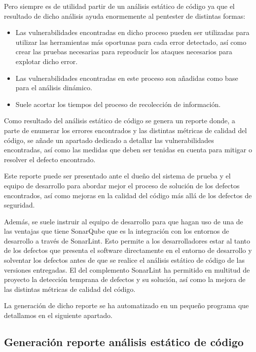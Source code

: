 Pero siempre es de utilidad partir de un análisis estático de código ya que el resultado de dicho 
análisis ayuda enormemente al pentester de distintas formas:

\begin{itemize}
    \item Las vulnerabilidades encontradas en dicho proceso pueden ser utilizadas para utilizar las herramientas más 
    oportunas para cada error detectado, así como crear las pruebas necesarias para reproducir los ataques necesarios 
    para explotar dicho error.
    \item Las vulnerabilidades encontradas en este proceso son añadidas como base para el análisis dinámico.
    \item Suele acortar los tiempos del proceso de recolección de información.
\end{itemize}

Como resultado del análisis estático de código se genera un reporte donde, a parte de enumerar los errores
encontrados y las distintas métricas de calidad del código, se añade un apartado dedicado a detallar las 
vulnerabilidades encontradas, así como las medidas que deben ser tenidas en cuenta para mitigar o resolver el defecto encontrado.

Este reporte puede ser presentado ante el dueño del sistema de prueba y el equipo de desarrollo para abordar mejor 
el proceso de solución de los defectos encontrados, así como mejoras en la calidad del código más allá de los defectos de seguridad.

Además, se suele instruir al equipo de desarrollo para que hagan uso de una de las ventajas que tiene SonarQube 
que es la integración con los entornos de desarrollo a través de SonarLint. Esto permite a los desarrolladores 
estar al tanto de los defectos que presenta el software directamente en el entorno de desarrollo y solventar 
los defectos antes de que se realice el análisis estático de código de las versiones entregadas. El del complemento SonarLint
 ha permitido en multitud de proyecto la detección temprana de defectos y su solución, así como la mejora 
 de las distintas métricas de calidad del código.

La generación de dicho reporte se ha automatizado en un pequeño programa que detallamos en el siguiente apartado.

\subsection{Generación reporte análisis estático de código}


